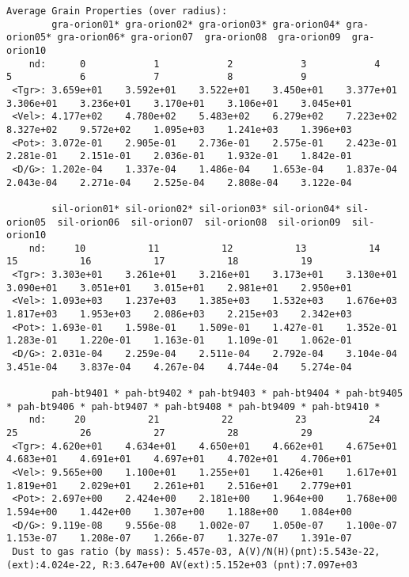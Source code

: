 {\setverbatimfontsize{\tiny}
\begin{verbatim}
Average Grain Properties (over radius):
        gra-orion01* gra-orion02* gra-orion03* gra-orion04* gra-orion05* gra-orion06* gra-orion07  gra-orion08  gra-orion09  gra-orion10
    nd:      0            1            2            3            4            5            6            7            8            9
 <Tgr>: 3.659e+01    3.592e+01    3.522e+01    3.450e+01    3.377e+01    3.306e+01    3.236e+01    3.170e+01    3.106e+01    3.045e+01
 <Vel>: 4.177e+02    4.780e+02    5.483e+02    6.279e+02    7.223e+02    8.327e+02    9.572e+02    1.095e+03    1.241e+03    1.396e+03
 <Pot>: 3.072e-01    2.905e-01    2.736e-01    2.575e-01    2.423e-01    2.281e-01    2.151e-01    2.036e-01    1.932e-01    1.842e-01
 <D/G>: 1.202e-04    1.337e-04    1.486e-04    1.653e-04    1.837e-04    2.043e-04    2.271e-04    2.525e-04    2.808e-04    3.122e-04

        sil-orion01* sil-orion02* sil-orion03* sil-orion04* sil-orion05  sil-orion06  sil-orion07  sil-orion08  sil-orion09  sil-orion10
    nd:     10           11           12           13           14           15           16           17           18           19
 <Tgr>: 3.303e+01    3.261e+01    3.216e+01    3.173e+01    3.130e+01    3.090e+01    3.051e+01    3.015e+01    2.981e+01    2.950e+01
 <Vel>: 1.093e+03    1.237e+03    1.385e+03    1.532e+03    1.676e+03    1.817e+03    1.953e+03    2.086e+03    2.215e+03    2.342e+03
 <Pot>: 1.693e-01    1.598e-01    1.509e-01    1.427e-01    1.352e-01    1.283e-01    1.220e-01    1.163e-01    1.109e-01    1.062e-01
 <D/G>: 2.031e-04    2.259e-04    2.511e-04    2.792e-04    3.104e-04    3.451e-04    3.837e-04    4.267e-04    4.744e-04    5.274e-04

        pah-bt9401 * pah-bt9402 * pah-bt9403 * pah-bt9404 * pah-bt9405 * pah-bt9406 * pah-bt9407 * pah-bt9408 * pah-bt9409 * pah-bt9410 *
    nd:     20           21           22           23           24           25           26           27           28           29
 <Tgr>: 4.620e+01    4.634e+01    4.650e+01    4.662e+01    4.675e+01    4.683e+01    4.691e+01    4.697e+01    4.702e+01    4.706e+01
 <Vel>: 9.565e+00    1.100e+01    1.255e+01    1.426e+01    1.617e+01    1.819e+01    2.029e+01    2.261e+01    2.516e+01    2.779e+01
 <Pot>: 2.697e+00    2.424e+00    2.181e+00    1.964e+00    1.768e+00    1.594e+00    1.442e+00    1.307e+00    1.188e+00    1.084e+00
 <D/G>: 9.119e-08    9.556e-08    1.002e-07    1.050e-07    1.100e-07    1.153e-07    1.208e-07    1.266e-07    1.327e-07    1.391e-07
 Dust to gas ratio (by mass): 5.457e-03, A(V)/N(H)(pnt):5.543e-22, (ext):4.024e-22, R:3.647e+00 AV(ext):5.152e+03 (pnt):7.097e+03
\end{verbatim}
}

